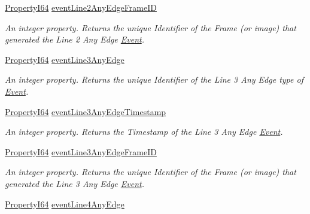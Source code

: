 \begin{DoxyCompactItemize}
\hyperlink{group___common_interface_ga81749b2696755513663492664a18a893}{Property\+I64} \hyperlink{classmv_i_m_p_a_c_t_1_1acquire_1_1_gen_i_cam_1_1_event_control_a6276c068496d78d86f124b560b01963e}{event\+Line2\+Any\+Edge\+Frame\+I\+D}
\begin{DoxyCompactList}\small\item\em An integer property. Returns the unique Identifier of the Frame (or image) that generated the Line 2 Any Edge \hyperlink{classmv_i_m_p_a_c_t_1_1acquire_1_1_event}{Event}. \end{DoxyCompactList}\item 
\hyperlink{group___common_interface_ga81749b2696755513663492664a18a893}{Property\+I64} \hyperlink{classmv_i_m_p_a_c_t_1_1acquire_1_1_gen_i_cam_1_1_event_control_ab496218af7296bd79d84807ec1081509}{event\+Line3\+Any\+Edge}
\begin{DoxyCompactList}\small\item\em An integer property. Returns the unique Identifier of the Line 3 Any Edge type of \hyperlink{classmv_i_m_p_a_c_t_1_1acquire_1_1_event}{Event}. \end{DoxyCompactList}\item 
\hyperlink{group___common_interface_ga81749b2696755513663492664a18a893}{Property\+I64} \hyperlink{classmv_i_m_p_a_c_t_1_1acquire_1_1_gen_i_cam_1_1_event_control_ac46fadd044d1e513837ce1fe7fa4f498}{event\+Line3\+Any\+Edge\+Timestamp}
\begin{DoxyCompactList}\small\item\em An integer property. Returns the Timestamp of the Line 3 Any Edge \hyperlink{classmv_i_m_p_a_c_t_1_1acquire_1_1_event}{Event}. \end{DoxyCompactList}\item 
\hyperlink{group___common_interface_ga81749b2696755513663492664a18a893}{Property\+I64} \hyperlink{classmv_i_m_p_a_c_t_1_1acquire_1_1_gen_i_cam_1_1_event_control_a1f74f4c2de3a26db4c39912585a6042b}{event\+Line3\+Any\+Edge\+Frame\+I\+D}
\begin{DoxyCompactList}\small\item\em An integer property. Returns the unique Identifier of the Frame (or image) that generated the Line 3 Any Edge \hyperlink{classmv_i_m_p_a_c_t_1_1acquire_1_1_event}{Event}. \end{DoxyCompactList}\item 
\hyperlink{group___common_interface_ga81749b2696755513663492664a18a893}{Property\+I64} \hyperlink{classmv_i_m_p_a_c_t_1_1acquire_1_1_gen_i_cam_1_1_event_control_ac00daec6a65198054205a9f152482cf7}{event\+Line4\+Any\+Edge}

\end{DoxyCompactItemize}
